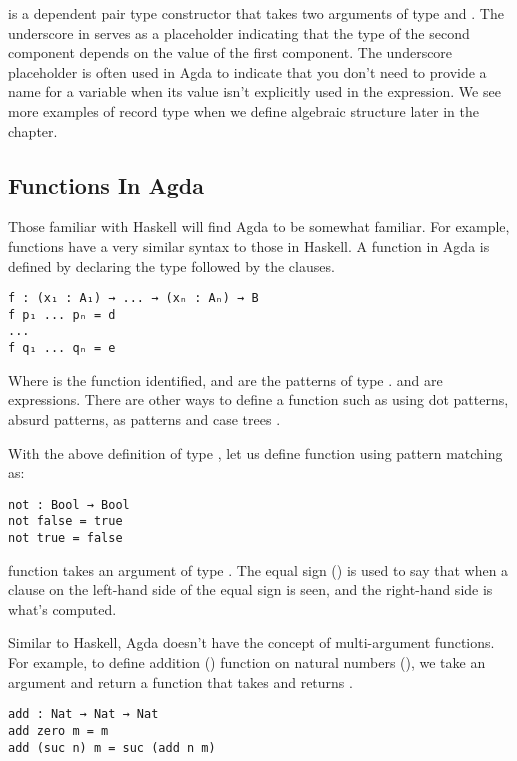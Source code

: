  is a dependent pair type constructor that takes two arguments of type
 and . The underscore in 
serves as a placeholder indicating that the type of the second component depends
on the value of the first component. The underscore \inline{(_)} placeholder is
often used in Agda to indicate that you don't need to provide a name for a
variable when its value isn't explicitly used in the expression. We see more
examples of record type when we define algebraic structure later in the chapter. 

\subsection{Functions In Agda}
Those familiar with Haskell will find Agda to be somewhat familiar. For example,
functions have a very similar syntax to those in Haskell. A function in Agda is
defined by declaring the type followed by the clauses.

\begin{verbatim}
f : (x₁ : A₁) → ... → (xₙ : Aₙ) → B
f p₁ ... pₙ = d
...
f q₁ ... qₙ = e
\end{verbatim} 

Where  is the function identified,  and  are the
patterns of type .  and  are expressions. There
are other ways to define a function such as using dot patterns, absurd patterns,
as patterns and case trees \cite{10.1007/978-3-642-03359-9_6}.

With the above definition of type , let us define  
function using pattern matching as:

\begin{verbatim}
not : Bool → Bool
not false = true
not true = false
\end{verbatim} 

 function takes an argument of type . The equal sign
(\inline{=}) is used to say that when a clause on the left-hand side of the
equal sign is seen, and the right-hand side is what's computed.  

Similar to Haskell, Agda doesn't have the concept of multi-argument functions.
For example, to define addition () function on natural numbers
(), we take an argument  and return a function that
takes  and returns .

\begin{verbatim}
add : Nat → Nat → Nat
add zero m = m
add (suc n) m = suc (add n m)
\end{verbatim}

